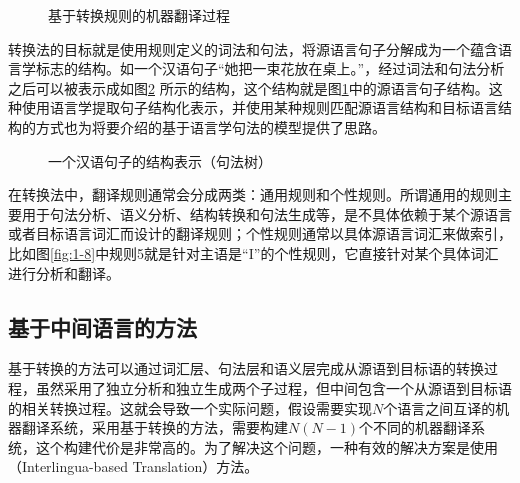 \begin{figure}[htp]
    \centering

    \caption{基于转换规则的机器翻译过程}
    \label{fig:1-10}
\end{figure}

\parinterval 转换法的目标就是使用规则定义的词法和句法，将源语言句子分解成为一个蕴含语言学标志的结构。如一个汉语句子“她把一束花放在桌上。”，经过词法和句法分析之后可以被表示成如图\ref{fig:1-11} 所示的结构，这个结构就是图\ref{fig:1-10}中的源语言句子结构。这种使用语言学提取句子结构化表示，并使用某种规则匹配源语言结构和目标语言结构的方式也为{\chaptereight}将要介绍的基于语言学句法的模型提供了思路。

\begin{figure}[htp]
    \centering

    \caption{一个汉语句子的结构表示（句法树）}
    \label{fig:1-11}
\end{figure}

\parinterval 在转换法中，翻译规则通常会分成两类：通用规则和个性规则。所谓通用的规则主要用于句法分析、语义分析、结构转换和句法生成等，是不具体依赖于某个源语言或者目标语言词汇而设计的翻译规则；个性规则通常以具体源语言词汇来做索引，比如图\ref{fig:1-8}中规则5就是针对主语是“I”的个性规则，它直接针对某个具体词汇进行分析和翻译。


\subsection{基于中间语言的方法}

\parinterval 基于转换的方法可以通过词汇层、句法层和语义层完成从源语到目标语的转换过程，虽然采用了独立分析和独立生成两个子过程，但中间包含一个从源语到目标语的相关转换过程。这就会导致一个实际问题，假设需要实现$N$个语言之间互译的机器翻译系统，采用基于转换的方法，需要构建$N(N-1)$个不同的机器翻译系统，这个构建代价是非常高的。为了解决这个问题，一种有效的解决方案是使用{\small{}}（Interlingua-based Translation）方法。

